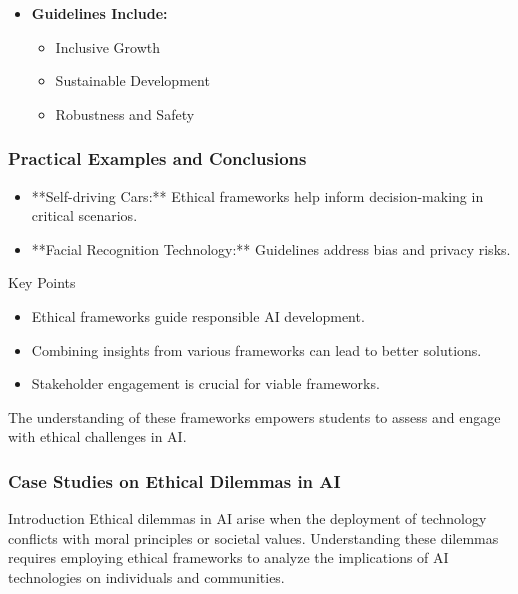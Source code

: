 \documentclass[aspectratio=169]{beamer}
\begin{document}
\begin{frame}[fragile]
\begin{enumerate}
            \begin{itemize}
                \item \textbf{Guidelines Include:}
                    \begin{itemize}
                        \item Inclusive Growth
                        \item Sustainable Development
                        \item Robustness and Safety
                    \end{itemize}
            \end{itemize}
    \end{enumerate}
\end{frame}

\begin{frame}[fragile]
    \frametitle{Practical Examples and Conclusions}
    \begin{itemize}
        \item **Self-driving Cars:** Ethical frameworks help inform decision-making in critical scenarios.
        \item **Facial Recognition Technology:** Guidelines address bias and privacy risks.
    \end{itemize}
    
    \begin{block}{Key Points}
        \begin{itemize}
            \item Ethical frameworks guide responsible AI development.
            \item Combining insights from various frameworks can lead to better solutions.
            \item Stakeholder engagement is crucial for viable frameworks.
        \end{itemize}
    \end{block}
    
    The understanding of these frameworks empowers students to assess and engage with ethical challenges in AI.
\end{frame}

\begin{frame}[fragile]
    \frametitle{Case Studies on Ethical Dilemmas in AI}
    \begin{block}{Introduction}
        Ethical dilemmas in AI arise when the deployment of technology conflicts with moral principles or societal values. Understanding these dilemmas requires employing ethical frameworks to analyze the implications of AI technologies on individuals and communities.
    \end{block}
\end{frame}
\end{document}
